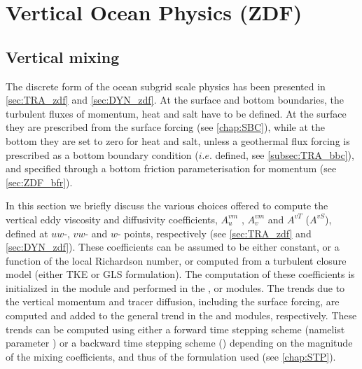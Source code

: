 \documentclass[../main/NEMO_manual]{subfiles}
\begin{document}
\chapter{Vertical Ocean Physics (ZDF)}
\label{chap:ZDF}

\minitoc


\newpage

\section{Vertical mixing}
\label{sec:ZDF_zdf}

The discrete form of the ocean subgrid scale physics has been presented in
\autoref{sec:TRA_zdf} and \autoref{sec:DYN_zdf}.
At the surface and bottom boundaries, the turbulent fluxes of momentum, heat and salt have to be defined.
At the surface they are prescribed from the surface forcing (see \autoref{chap:SBC}),
while at the bottom they are set to zero for heat and salt,
unless a geothermal flux forcing is prescribed as a bottom boundary condition ($i.e.$  defined,
see \autoref{subsec:TRA_bbc}), and specified through a bottom friction parameterisation for momentum
(see \autoref{sec:ZDF_bfr}).

In this section we briefly discuss the various choices offered to compute the vertical eddy viscosity and
diffusivity coefficients, $A_u^{vm}$ , $A_v^{vm}$ and $A^{vT}$ ($A^{vS}$), defined at $uw$-, $vw$- and $w$- points,
respectively (see \autoref{sec:TRA_zdf} and \autoref{sec:DYN_zdf}).
These coefficients can be assumed to be either constant, or a function of the local Richardson number,
or computed from a turbulent closure model (either TKE or GLS formulation).
The computation of these coefficients is initialized in the  module and performed in
the ,  or  modules.
The trends due to the vertical momentum and tracer diffusion, including the surface forcing,
are computed and added to the general trend in the  and  modules, respectively. 
These trends can be computed using either a forward time stepping scheme
(namelist parameter ) or a backward time stepping scheme
() depending on the magnitude of the mixing coefficients,
and thus of the formulation used (see \autoref{chap:STP}).
\end{document}
